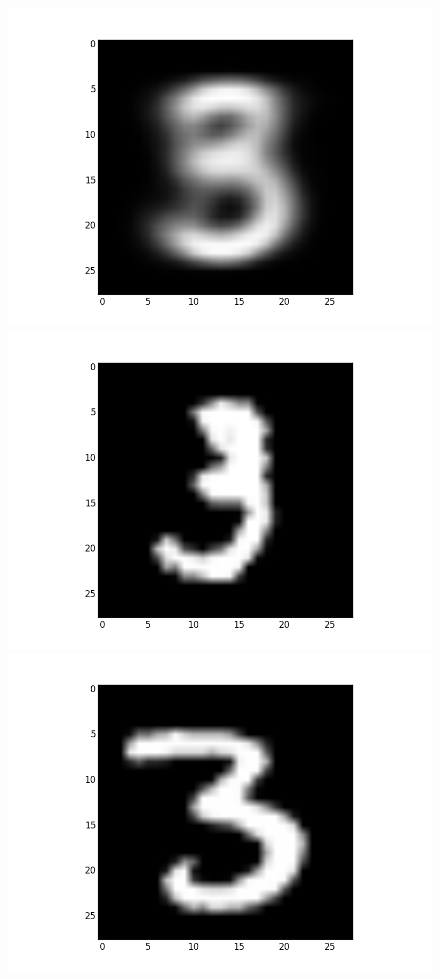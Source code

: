 \documentclass[submit]{harvardml}
\begin{document}
\begin{figure}[ht]
    \centering
    \includegraphics[scale=0.20]{K10-mean-1}
    \includegraphics[scale=0.20]{K10-representative-1-0}
    \includegraphics[scale=0.20]{K10-representative-1-1}

\end{figure}
\end{document}
